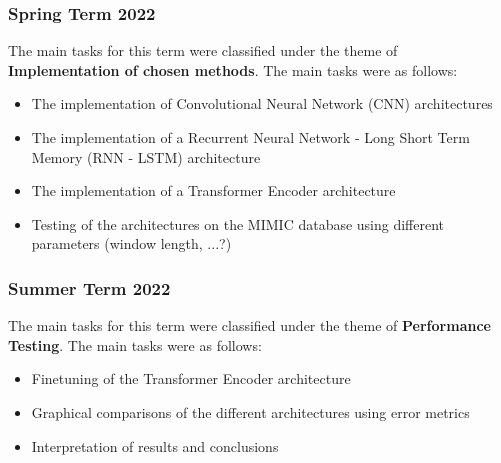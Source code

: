 \subsubsection{Spring Term 2022}
The main tasks for this term were classified under the theme of \textbf{Implementation of chosen methods}. The main tasks were as follows:
\begin{itemize}
    \item The implementation of Convolutional Neural Network (CNN) architectures    
    \item The implementation of a Recurrent Neural Network - Long Short Term Memory (RNN - LSTM) architecture
    \item The implementation of a Transformer Encoder architecture
    \item Testing of the architectures on the MIMIC database using different parameters (window length, ...?)
\end{itemize}

\subsubsection{Summer Term 2022}
The main tasks for this term were classified under the theme of \textbf{Performance Testing}. The main tasks were as follows:
\begin{itemize}
    \item Finetuning of the Transformer Encoder architecture
    \item Graphical comparisons of the different architectures using error metrics
    \item Interpretation of results and conclusions 
\end{itemize}




